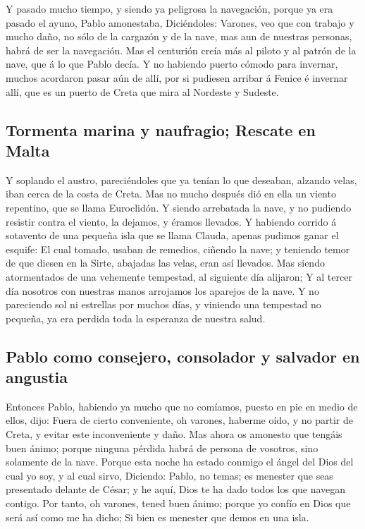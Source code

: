  Y pasado mucho tiempo, y siendo ya peligrosa la navegación,
porque ya era pasado el ayuno, Pablo amonestaba, 
Diciéndoles: Varones, veo que con trabajo y mucho daño, no sólo de la
cargazón y de la nave, mas aun de nuestras personas, habrá de ser la
navegación.  Mas el centurión creía más al piloto y al
patrón de la nave, que á lo que Pablo decía.  Y no habiendo
puerto cómodo para invernar, muchos acordaron pasar aún de allí, por si
pudiesen arribar á Fenice é invernar allí, que es un puerto de Creta que
mira al Nordeste y Sudeste.

\hypertarget{tormenta-marina-y-naufragio-rescate-en-malta}{%
\subsection{Tormenta marina y naufragio; Rescate en
Malta}\label{tormenta-marina-y-naufragio-rescate-en-malta}}

 Y soplando el austro, pareciéndoles que ya tenían lo que
deseaban, alzando velas, iban cerca de la costa de Creta. 
Mas no mucho después dió en ella un viento repentino, que se llama
Euroclidón.  Y siendo arrebatada la nave, y no pudiendo
resistir contra el viento, la dejamos, y éramos llevados. 
Y habiendo corrido á sotavento de una pequeña isla que se llama Clauda,
apenas pudimos ganar el esquife:  El cual tomado, usaban de
remedios, ciñendo la nave; y teniendo temor de que diesen en la Sirte,
abajadas las velas, eran así llevados.  Mas siendo
atormentados de una vehemente tempestad, al siguiente día alijaron;
 Y al tercer día nosotros con nuestras manos arrojamos los
aparejos de la nave.  Y no pareciendo sol ni estrellas por
muchos días, y viniendo una tempestad no pequeña, ya era perdida toda la
esperanza de nuestra salud.

\hypertarget{pablo-como-consejero-consolador-y-salvador-en-angustia}{%
\subsection{Pablo como consejero, consolador y salvador en
angustia}\label{pablo-como-consejero-consolador-y-salvador-en-angustia}}

 Entonces Pablo, habiendo ya mucho que no comíamos, puesto
en pie en medio de ellos, dijo: Fuera de cierto conveniente, oh varones,
haberme oído, y no partir de Creta, y evitar este inconveniente y daño.
 Mas ahora os amonesto que tengáis buen ánimo; porque
ninguna pérdida habrá de persona de vosotros, sino solamente de la nave.
 Porque esta noche ha estado conmigo el ángel del Dios del
cual yo soy, y al cual sirvo,  Diciendo: Pablo, no temas;
es menester que seas presentado delante de César; y he aquí, Dios te ha
dado todos los que navegan contigo.  Por tanto, oh varones,
tened buen ánimo; porque yo confío en Dios que será así como me ha
dicho;  Si bien es menester que demos en una isla.


